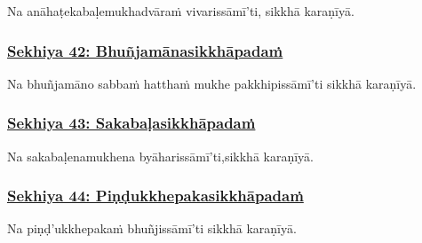 Na anāhaṭe\makeatletter\hyperlink{endnote494-appendix}\makeatother \thinspace kabaḷe\makeatletter\hyperlink{endnote495-appendix}\makeatother \thinspace mukhadvāraṁ vivarissāmī'ti, sikkhā karaṇīyā.



\subsubsection*{\hyperref[training42]{Sekhiya 42: Bhuñjamānasikkhāpadaṁ}}
\label{sekh42}

Na bhuñjamāno sabbaṁ hatthaṁ mukhe pakkhipissāmī'ti sikkhā karaṇīyā.



\subsubsection*{\hyperref[training43]{Sekhiya 43: Sakabaḷasikkhāpadaṁ}}
\label{sekh43}

Na sakabaḷena\makeatletter\hyperlink{endnote496-appendix}\makeatother \thinspace mukhena byāharissāmī'ti,\makeatletter\hyperlink{endnote497-appendix}\makeatother \thinspace sikkhā karaṇīyā.



\subsubsection*{\hyperref[training44]{Sekhiya 44: Piṇḍukkhepakasikkhāpadaṁ}}
\label{sekh44}

Na piṇḍ'ukkhepakaṁ bhuñjissāmī'ti sikkhā karaṇīyā.



